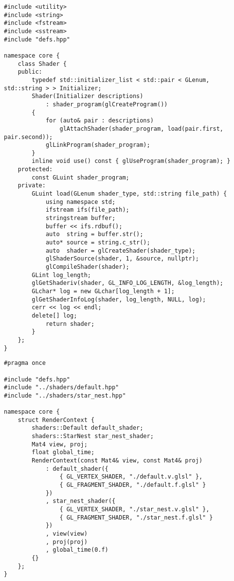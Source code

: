 \begin{lstlisting}[caption=shader.hpp]
#include <utility>
#include <string>
#include <fstream>
#include <sstream>
#include "defs.hpp"

namespace core {
    class Shader {
    public:
        typedef std::initializer_list < std::pair < GLenum, std::string > > Initializer;
        Shader(Initializer descriptions)
            : shader_program(glCreateProgram())
        {
            for (auto& pair : descriptions)
                glAttachShader(shader_program, load(pair.first, pair.second));
            glLinkProgram(shader_program);
        }
        inline void use() const { glUseProgram(shader_program); }
    protected:
        const GLuint shader_program;
    private:
        GLuint load(GLenum shader_type, std::string file_path) {
            using namespace std;
            ifstream ifs(file_path);
            stringstream buffer;
            buffer << ifs.rdbuf();
            auto  string = buffer.str();
            auto* source = string.c_str();
            auto  shader = glCreateShader(shader_type);
            glShaderSource(shader, 1, &source, nullptr);
            glCompileShader(shader);
	    GLint log_length;
	    glGetShaderiv(shader, GL_INFO_LOG_LENGTH, &log_length);
	    GLchar* log = new GLchar[log_length + 1];
	    glGetShaderInfoLog(shader, log_length, NULL, log);
	    cerr << log << endl;
	    delete[] log;
            return shader;
        }
    };
}
\end{lstlisting}

\begin{lstlisting}[caption=render_context.hpp]
#pragma once

#include "defs.hpp"
#include "../shaders/default.hpp"
#include "../shaders/star_nest.hpp"

namespace core {
    struct RenderContext {
        shaders::Default default_shader;
        shaders::StarNest star_nest_shader;
        Mat4 view, proj;
        float global_time;
        RenderContext(const Mat4& view, const Mat4& proj)
            : default_shader({
                { GL_VERTEX_SHADER, "./default.v.glsl" },
                { GL_FRAGMENT_SHADER, "./default.f.glsl" }
            })
            , star_nest_shader({
                { GL_VERTEX_SHADER, "./star_nest.v.glsl" },
                { GL_FRAGMENT_SHADER, "./star_nest.f.glsl" }
            })
            , view(view)
            , proj(proj)
            , global_time(0.f)
        {}
    };
}
\end{lstlisting}

